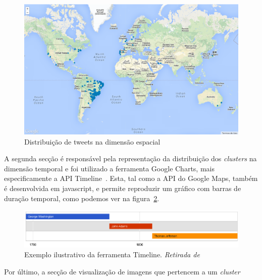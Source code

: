 \begin{figure}[h]
\centering
\includegraphics[width=1.0\linewidth]{./figures/olhopassarinho/map1.png}
\caption{Distribuição de tweets na dimensão espacial}
\label{fig:map1}
\end{figure}

A segunda secção é responsável pela representação da distribuição dos \textit{clusters} na dimensão temporal e foi utilizado a ferramenta Google Charts, mais especificamente a API Timeline~\cite{googletimeline}. Esta, tal como a API do Google Maps, também é desenvolvida em javascript, e permite reproduzir um gráfico com barras de duração temporal, como podemos ver na figura~\ref{fig:timeex}. 

\begin{figure}[h]
\centering
\includegraphics[width=1.0\linewidth]{./figures/olhopassarinho/time_example.png}
\caption{Exemplo ilustrativo da ferramenta Timeline. \textit{Retirada de}~\cite{googletimeline}}
\label{fig:timeex}
\end{figure}

Por último, a secção de visualização de imagens que pertencem a um \textit{cluster} 

%
